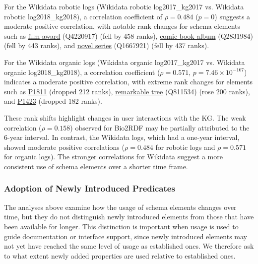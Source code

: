 \documentclass[sw]{iosart2x}
\begin{document}
For the Wikidata robotic logs (Wikidata robotic log2017\_kg2017 vs. Wikidata robotic log2018\_kg2018), a correlation coefficient of $\rho = 0.484$ ($p = 0$) suggests a
moderate positive correlation, with notable rank changes for schema elements such as 
\href{http://www.wikidata.org/entity/Q4220917}{film award} (Q4220917) (fell by 458 ranks), 
\href{http://www.wikidata.org/entity/Q2831984}{comic book album} (Q2831984) (fell by 443 ranks), and 
\href{http://www.wikidata.org/entity/Q1667921}{novel series} (Q1667921) (fell by 437 ranks).

For the Wikidata organic logs (Wikidata organic log2017\_kg2017 vs. Wikidata organic log2018\_kg2018), a correlation coefficient ($\rho = 0.571$, $p = 7.46 \times 10^{-167}$) indicates a moderate positive correlation, with extreme rank changes for elements such as 
\href{http://www.wikidata.org/prop/direct/P1811}{P1811} (dropped 212 ranks), 
\href{http://www.wikidata.org/entity/Q811534}{remarkable tree} (Q811534) (rose 200 ranks), and 
\href{http://www.wikidata.org/prop/direct/P1423}{P1423} (dropped 182 ranks).

These rank shifts highlight changes in user interactions with the KG. The weak correlation ($\rho = 0.158$) observed for Bio2RDF may be partially attributed to the 6-year interval. In contrast, the Wikidata logs, which had a one-year interval, showed moderate positive correlations ($\rho = 0.484$ for robotic logs and $\rho = 0.571$ for organic logs). The stronger correlations for Wikidata suggest a more consistent use of schema elements over a shorter time frame.

\subsubsection{Adoption of Newly Introduced Predicates}\label{sec:adoption}

The analyses above examine how the usage of schema elements changes over time, but they do not distinguish newly introduced elements from those that have been available for longer. This distinction is important when usage is used to guide documentation or interface support, since newly introduced elements may not yet have reached the same level of usage as established ones. We therefore ask to what extent newly added properties are used relative to established ones.
\end{document}
